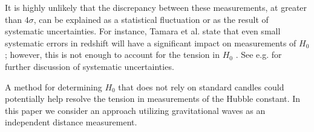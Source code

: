 It is highly unlikely that the discrepancy between these measurements, at greater than $4\sigma$, can be explained as a statistical fluctuation or as the result of systematic uncertainties.
For instance, Tamara et al. state that even small systematic errors in redshift will have a significant impact on measurements of $H_0$; however, this is not enough to account for the tension in $H_0$ \cite{Davis_2019}.
See e.g. \cite{Efstathiou_2021,Calabrese_2008} for further discussion of systematic uncertainties.

A method for determining $H_0$ that does not rely on standard candles could potentially help resolve the tension in measurements of the Hubble constant.
In this paper we consider an approach utilizing gravitational waves as an independent distance measurement.




